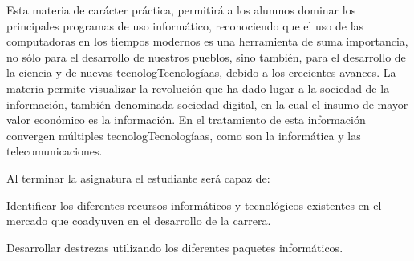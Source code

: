 \begin{syllabus}


\begin{justification}
Esta materia de carácter práctica, permitirá a los alumnos dominar los principales programas de uso informático, reconociendo que el uso de las computadoras en los tiempos modernos es una herramienta de suma importancia, no sólo para el desarrollo de nuestros pueblos, sino también, para el desarrollo de la ciencia y de nuevas tecnologTecnologíaas, debido a los crecientes avances. La materia permite visualizar la revolución que ha dado lugar a la sociedad de la información, también denominada sociedad digital, en la cual el insumo de mayor valor económico es la información. En el tratamiento de esta información convergen múltiples tecnologTecnologíaas, como son la informática y las telecomunicaciones. 
\end{justification}

\begin{goals}
Al terminar la asignatura el estudiante será capaz de:

\item Identificar los diferentes recursos informáticos y tecnológicos existentes en el mercado que coadyuven en el desarrollo de la carrera.
\item Desarrollar destrezas utilizando los diferentes paquetes informáticos.
\end{goals}

\begin{outcomes}
\end{outcomes}


\end{syllabus}

